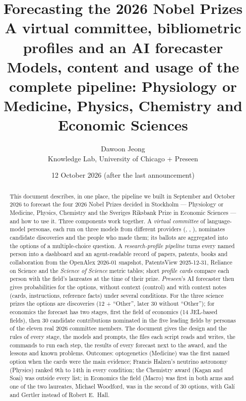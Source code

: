 \documentclass[11pt,a4paper]{article}
\title{Forecasting the 2026 Nobel Prizes\\[4pt]
\large A virtual committee, bibliometric profiles and an AI forecaster\\[2pt]
\large Models, content and usage of the complete pipeline: Physiology or Medicine, Physics, Chemistry and Economic Sciences}
\author{Dawoon Jeong\\ \small Knowledge Lab, University of Chicago \quad + \quad Preseen}
\date{12 October 2026 (after the last announcement)}
\begin{document}
\maketitle

\begin{abstract}
\noindent
This document describes, in one place, the pipeline we built in September and October 2026 to forecast the four 2026
Nobel Prizes decided in Stockholm --- Physiology or Medicine, Physics, Chemistry and the Sveriges Riksbank Prize in
Economic Sciences --- and how to use it. Three components work together. A \emph{virtual committee} of language-model
personas, each run on three models from different providers (, ,
), nominates candidate discoveries and the people who made them; its ballots are
aggregated into the options of a multiple-choice question. A \emph{research-profile pipeline} turns every named person
into a dashboard and an agent-readable record of papers, patents, books and collaboration from the OpenAlex 2026-01
snapshot, PatentsView 2025-12-31, Reliance on Science and the \emph{Science of Science} metric tables; short
\emph{profile cards} compare each person with the field's laureates at the time of their prize. \emph{Preseen}'s AI
forecaster then gives probabilities for the options, without context (control) and with context notes (cards,
instructions, reference facts) under several conditions. For the three science prizes the options are discoveries
(12 + ``Other'', later 30 without ``Other''); for economics the forecast has two stages, first the field of economics
(14 JEL-based fields), then 30 candidate contributions nominated in the five leading fields by personas of the eleven
real 2026 committee members. The document gives the design and the rules of every stage, the models and prompts, the
files each script reads and writes, the commands to run each step, the results of every forecast next to the award, and
the lessons and known problems. Outcomes: optogenetics (Medicine) was the first named option when the cards were the
main evidence; Francis Halzen's neutrino astronomy (Physics) ranked 9th to 14th in every condition; the Chemistry award
(Kagan and Soai) was outside every list; in Economics the field (Macro) was first in both arms and one of the two
laureates, Michael Woodford, was in the second of 30 options, with Galí and Gertler instead of Robert E.~Hall.
\end{abstract}

\tableofcontents
\clearpage
\end{document}
